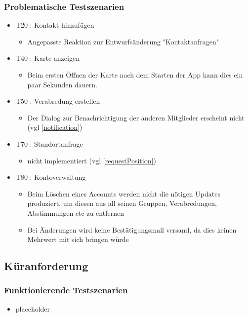 \documentclass[parskip=full,11pt]{scrartcl}
\begin{document}
		\subsubsection{Problematische Testszenarien}
			\begin{itemize}
				\item T20 : Kontakt hinzufügen
					\begin{itemize}
						\item Angepasste Reaktion zur Entwurfsänderung "Kontaktanfragen"
					\end{itemize}
				\item T40 : Karte anzeigen
					\begin{itemize}
						\item Beim ersten Öffnen der Karte nach dem Starten der App kann
									dies ein paar Sekunden dauern.
						\end{itemize}
				\item T50 : Verabredung erstellen
					\begin{itemize}
						\item Der Dialog zur Benachrichtigung der anderen Mitglieder
									erscheint nicht (vgl \ref{notification})
					\end{itemize}
				\item T70 : Standortanfrage
					\begin{itemize}
						\item nicht implementiert (vgl \ref{requestPosition})
					\end{itemize}
				\item T80 : Kontoverwaltung
					\begin{itemize}
          	\item Beim Löschen eines Accounts werden nicht die nötigen Updates
                	produziert, um diesen aus all seinen Gruppen, Verabredungen,
                	Abstimmungen etc zu entfernen
          	\item Bei Änderungen wird keine Bestätigungsmail versand, da dies
									keinen Mehrwert mit sich bringen würde
					\end{itemize}
				\end{itemize}

	\subsection{Küranforderung}
		\subsubsection{Funktionierende Testszenarien}
			\begin{itemize}
				\item placeholder
	\end{itemize}
\end{document}
